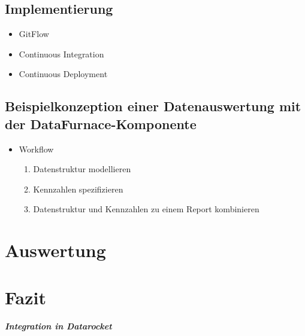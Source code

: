 \documentclass[
  language=german, %
  type=bachelor%
]{isthesis}
\begin{document}
\begin{content}
  \section{Implementierung}
  \begin{itemize}
    \item GitFlow
    \item Continuous Integration
    \item Continuous Deployment
  \end{itemize}

  \section{Beispielkonzeption einer Datenauswertung mit der DataFurnace-Komponente}
  \begin{itemize}
    \item Workflow
      \begin{enumerate}
        \item Datenstruktur modellieren
        \item Kennzahlen spezifizieren
        \item Datenstruktur und Kennzahlen zu einem Report kombinieren
      \end{enumerate}
  \end{itemize}


\chapter{Auswertung}

\chapter{Fazit}
 \paragraph{Integration in Datarocket}



  

\end{content}
\end{document}
